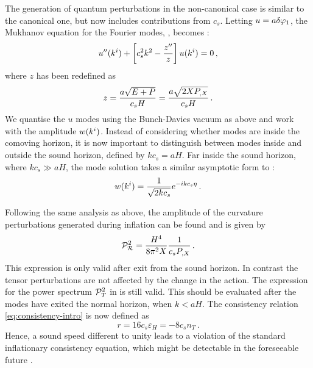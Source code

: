 The generation of quantum perturbations in the non-canonical case is similar to
the canonical one, but now includes contributions from $c_s$. Letting
$u=a\delta\varphi_{1}$, the Mukhanov equation for the
Fourier modes, , becomes
\cite{gm}:
% 
\begin{equation}
 u''(k^i) + \left[c_s^2 k^2 - \frac{z''}{z}\right] u(k^i) = 0\,,
\end{equation}
% 
where $z$ has been redefined as
% 
\begin{equation}
 z = \frac{a\sqrt{E+P}}{c_s H} = \frac{a\sqrt{2XP_{,X}}}{c_s H} \,.
\end{equation}
% 
We quantise the $u$ modes using the Bunch-Davies vacuum as above and work with the
amplitude $w(k^i)$. Instead of considering whether modes are
inside the comoving horizon, it is now important to distinguish between modes
inside and outside the sound horizon, defined by $kc_s = aH$. Far inside the sound
horizon, where $kc_s \gg aH$, the mode solution takes a similar asymptotic form to
:
% 
\begin{equation}
 w(k^i) = \frac{1}{\sqrt{2kc_s}} e^{-ikc_s \eta}\,.
\end{equation}


Following the same analysis as above, the amplitude of the curvature 
perturbations 
generated during inflation can be found and is given by
\cite{gm}
% 
\begin{equation} 
\label{eq:Ps-dbiintro}
 \mathcal{P}_{\mathcal{R}}^2  = \frac{H^4}{8\pi^2 X}\frac{1}{c_s P_{,X}} \,.
\end{equation}
% 
This expression is only valid after exit from the sound horizon. In contrast
the tensor perturbations are not affected by the change in the action. The
expression for the power spectrum $\mathcal{P}_T^2$ in  is still valid.
This should be evaluated after the modes have exited the normal horizon,
\iec when $k < aH$. 
The consistency relation \eqref{eq:consistency-intro} is now defined as
\cite{gm} 
% 
\begin{equation}
\label{eq:rdefn-dbiintro}
  r = 16c_s \varepsilon_H = -8c_s n_T \,.
\end{equation}
% 
Hence, a sound speed different to unity leads to a violation of the 
standard inflationary consistency equation, which might be 
detectable in the foreseeable future \cite{lidser1,lidser2}. 




